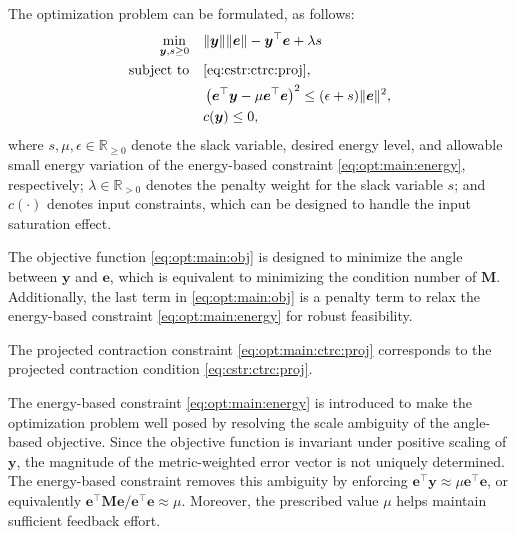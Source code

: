 \documentclass{ifacconf}
\newcommand\R{\mathbb{R}}
\newcommand*{\mv}[1]{\boldsymbol{#1}} %
\newcommand*{\mm}[1]{\boldsymbol{#1}} %
\newcommand*{\norm}[1]{\lVert #1 \rVert} %
\begin{document}
The optimization problem can be formulated, as follows:
\begin{subequations} \label{eq:opt:main}
   \begin{align}
      \min_{
         \mv{y},s\ge0
         } 
         \quad &
      \norm{\mv{y}}\norm{\mv{e}} - \mv{y}^\top \mv{e}
      +
      \lambda s
      \label{eq:opt:main:obj}
      \\
      \text{subject to} 
      \quad &
         \eqref{eq:cstr:ctrc:proj}
         ,
         \label{eq:opt:main:ctrc:proj}
         \\ &
         \left(
            \mv{e}^\top \mv{y} 
            -
            \mu \mv{e}^\top \mv{e}
         \right)^2
         \le
         (\epsilon + s) \norm{\mv{e}}^2
         ,
         \label{eq:opt:main:energy}
         \\ &
         c(\mv{y}) \le 0
         ,
         \label{eq:opt:main:sat}
   \end{align}
\end{subequations}
where $s,\mu,\epsilon\in\R_{\ge0}$ denote the slack variable, desired energy level, and allowable small energy variation of the energy-based constraint \eqref{eq:opt:main:energy}, respectively; $\lambda\in\R_{>0}$ denotes the penalty weight for the slack variable $s$; and $c(\cdot)$ denotes input constraints, which can be designed to handle the input saturation effect.

The objective function \eqref{eq:opt:main:obj} is designed to minimize the angle between $\mv{y}$ and $\mv{e}$, which is equivalent to minimizing the condition number of $\mm{M}$.
Additionally, the last term in \eqref{eq:opt:main:obj} is a penalty term to relax the energy-based constraint \eqref{eq:opt:main:energy} for robust feasibility.

The projected contraction constraint \eqref{eq:opt:main:ctrc:proj} corresponds to the projected contraction condition \eqref{eq:cstr:ctrc:proj}.

The energy-based constraint \eqref{eq:opt:main:energy} is introduced to make the optimization problem well posed by resolving the scale ambiguity of the angle-based objective.
Since the objective function is invariant under positive scaling of $\mv y$, the magnitude of the metric-weighted error vector is not uniquely determined.
The energy-based constraint removes this ambiguity by enforcing $\mv e^\top\mv y\approx\mu\mv e^\top\mv e$, or equivalently $\mv e^\top\mm M\mv e/\mv e^\top\mv e\approx\mu$.
Moreover, the prescribed value $\mu$ helps maintain sufficient feedback effort.
\end{document}
